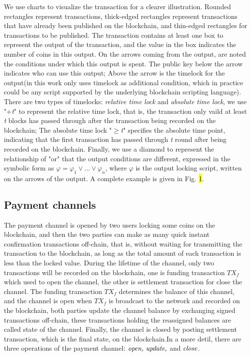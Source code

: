 \documentclass[conference]{IEEEtran}
\begin{document}
 We use charts to visualize the transaction for a clearer illustration. Rounded rectangles represent transactions, thick-edged rectangles 
 represent transactions that have already been published on the blockchain, and thin-edged rectangles for transactions to be published.
 The transaction contains at least one box to represent the output of the transaction, and the value in the box indicates the number of 
 coins in this output. On the arrows coming from the output, are noted the conditions under which this output is spent. The public key 
 below the arrow indicates who can use this output; Above the arrow is the timelock for the output(in this work only uses timelock 
 as additional condition, which in practice could be any script supported by the underlying blockchain scripting language). There are 
 two types of timelocks: \emph{relative time lock} and \emph{absolute time lock}, we use "+\emph{t}" to represent the relative time lock, 
 that is, the transaction only vaild at least \emph{t} blocks has passed through after the transaction being recorded on the blockchain; 
 The absolute time lock "$\geq$\emph{t}" specifies the absolute time point, indicating that the first transaction has passed through \emph{t} 
 round after being recorded on the blockchain. Finally, we use a diamond to represent the relationship of "or" that the output conditions are 
 different, expressed in the symbolic form as $\varphi = \varphi_1 \vee ...\vee \varphi_n$, where $\varphi$ is the output locking script,
 written on the arrows of the output. A complete example is given in Fig. \colorbox{yellow}{1}.

\subsection{Payment channels}

The payment channel is opened by two users locking some coins on the blockchain, and then the two parties can make as many quick 
instant confirmation transactions off-chain, that is, without waiting for transmitting the transaction to the blockchain, as long 
as the total amount of each transaction is less than the locked value. During the lifetime of the channel, only two transactions 
will be recorded on the blockchain, one is funding transaction $TX_f$ which used to open the channel, the other is settlement 
transaction for close the channel. The funding transaction $TX_f$ determines the balance of this channel, and the channel is open 
when $TX_f$ is broadcast to the network and recorded on the blockchain, both parties update the channel balance by exchanging signed 
transactions off-chain, these transactions holding the reassigned balances are called state of the channel. Finally, the 
channel is closed by posting settlement transaction, which is the final state, on the blockchain.In a more detil, there are three 
operations of the payment channel: $\emph{open, update,}$ and  $\emph{close}$.
\end{document}
